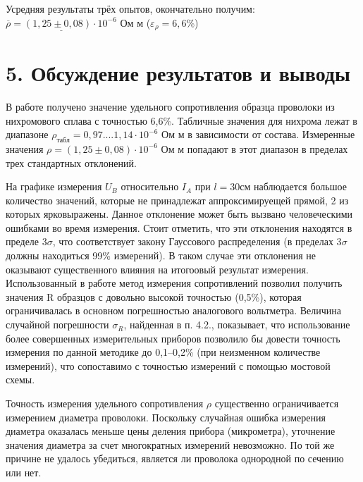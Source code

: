 Усредняя результаты трёх опытов, окончательно получим:\\


$\underline{\overline{\rho} = (1,25 \pm 0,08)\cdot{10^{-6}}}$ Ом м ($\varepsilon_{\rho} = 6,6\%$)\


\section*{5. Обсуждение результатов и выводы}


В работе получено значение удельного сопротивления образца проволоки из нихромового сплава с точностью 6,6\%. Табличные значения для нихрома лежат в диапазоне $\rho_{табл} = 0,97 .... 1,14\cdot10^{-6}$ Ом м в зависимости от состава. Измеренные значения $\rho = (1,25 \pm 0,08) \cdot 10^{-6}$ Ом м попадают в этот диапазон в пределах трех стандартных отклонений. 


На графике измерения $U_B$ относительно $I_A$ при $l = 30$см наблюдается большое количество значений, которые не принадлежат аппроксимируещей прямой, 2 из которых ярковыражены. Данное отклонение может быть вызвано человеческими ошибками во время измерения. Стоит отметить, что эти отклонения находятся в пределе 3$\sigma$, что соответствует закону Гауссового распределения (в пределах 3$\sigma$ должны находиться 99\% измерений). В таком случае эти отклонения не оказывают существенного влияния на итогоовый результат измерения.\
\\ 

Использованный в работе метод измерения сопротивлений позволил получить значения R образцов с довольно высокой точностью (0,5\%), которая ограничивалась в основном погрешностью аналогового вольтметра. Величина случайной погрешности $\sigma_{R}$, найденная в п. 4.2., показывает, что использование более совершенных измерительных приборов позволило бы довести точность измерения по данной методике до 0,1–0,2\% (при неизменном количестве измерений), что сопоставимо с точностью измерений с помощью мостовой схемы.


Точность измерения удельного сопротивления $\rho$ существенно ограничивается измерением диаметра проволоки. Поскольку случайная ошибка измерения диаметра оказалась меньше цены деления прибора (микрометра), уточнение значения диаметра за счет многократных измерений невозможно. По той же причине не удалось убедиться, является ли проволока однородной по сечению или нет.


